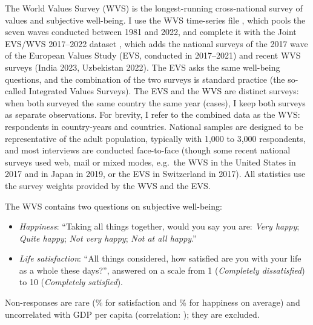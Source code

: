 \documentclass[12pt]{article}
\begin{document}
The World Values Survey (WVS) is the longest-running cross-national survey of values and subjective well-being. I use the WVS time-series file \citep{wvs_trend_2022}, which pools the seven waves conducted between 1981 and 2022, and complete it with the Joint EVS/WVS 2017--2022 dataset \citep{evs_wvs_joint_2024}, which adds the \nEVSSurveys national surveys of the 2017 wave of the European Values Study (EVS, conducted in 2017--2021) and \nNewWVSSurveys recent WVS surveys (India 2023, Uzbekistan 2022). The EVS asks the same well-being questions, and the combination of the two surveys is standard practice (the so-called Integrated Values Surveys). The EVS and the WVS are distinct surveys: when both surveyed the same country the same year (\nEVSSameYearWVS cases), I keep both surveys as separate observations.
For brevity, I refer to the combined data as the WVS: \nWVSRespondents respondents in \nWVSCountryYears country-years and \nWVSCountries countries. National samples are designed to be representative of the adult population, typically with 1,000 to 3,000 respondents, and most interviews are conducted face-to-face (though some recent national surveys used web, mail or mixed modes, e.g.\ the WVS in the United States in 2017 and in Japan in 2019, or the EVS in Switzerland in 2017). All statistics use the survey weights provided by the WVS and the EVS.

The WVS contains two questions on subjective well-being:
\begin{itemize}
    \item \textit{Happiness}: ``Taking all things together, would you say you are: \textit{Very happy}; \textit{Quite happy}; \textit{Not very happy}; \textit{Not at all happy}.''
    \item \textit{Life satisfaction}: ``All things considered, how satisfied are you with your life as a whole these days?'', answered on a scale from 1 (\textit{Completely dissatisfied}) to 10 (\textit{Completely satisfied}).
\end{itemize}
Non-responses are rare (\nonresponseSatisfactionWVS\% for satisfaction and \nonresponseHappinessWVS\% for happiness on average) and uncorrelated with GDP per capita (correlation: \corNonresponseGDP); they are excluded.

\ifshowregion
\end{document}

